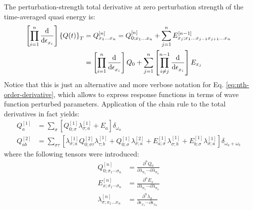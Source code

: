 The perturbation-strength total derivative at zero perturbation strength
of the time-averaged quasi energy is:
\begin{equation}
\begin{aligned}
 \left[\prod_{i=1}^n \frac{\mathop{}\!\mathrm{d}^{}}{\mathop{}\!\mathrm{d} \epsilon_{x_i}^{}}\right]\left\lbrace Q(t)\right\rbrace_T
 &= Q^{[n]}_{x_1 \ldots x_n}
 =
 Q^{[n]}_{0; x_1 \ldots x_n}
 + \sum_{j=1}^{n}E^{[n-1]}_{x_j;x_1\ldots x_{j-1}x_{j+1}\ldots x_n} \\
 &=
 \left[\prod_{i=1}^n \frac{\mathop{}\!\mathrm{d}^{}}{\mathop{}\!\mathrm{d} \epsilon_{x_i}^{}}\right]Q_0
 + \sum_{j=1}^n
 \left[\prod_{i\neq j}^{n-1} \frac{\mathop{}\!\mathrm{d}^{}}{\mathop{}\!\mathrm{d} \epsilon_{x_i}^{}}\right]E_{x_j}
\end{aligned}
\end{equation}
Notice that this is just an alternative and more verbose notation for
Eq. \eqref{eq:nth-order-derivative}, which allows to express response
functions in terms of wave function perturbed parameters.
Application of the chain rule to the total derivatives in fact yields:
\begin{subequations}
 \begin{align}
   Q^{[1]}_{a} &=
   \sum_{\sigma}\left[
   Q^{[1]}_{0; \sigma}\lambda^{[1]}_{\sigma;a} + E_{a}
   \right]\delta_{\omega_a} \\
   Q^{[2]}_{ab} &=
   \sum_{\sigma\tau}\left[
   \lambda^{[1]}_{\sigma;a}Q^{[2]}_{0;\sigma\tau}\lambda^{[1]}_{\tau;b}
   + Q^{[1]}_{0; \sigma}\lambda^{[2]}_{\sigma;a}
   + E^{[1]}_{a;\sigma}\lambda^{[1]}_{\sigma;b}
   + E^{[1]}_{b;\sigma}\lambda^{[1]}_{\sigma;a}
   \right]\delta_{\omega_a+\omega_b} \label{eq:linres}
 \end{align}
\end{subequations}
where the following tensors were introduced:
\begin{subequations}
 \begin{align}
 Q^{[n]}_{0; \sigma_1\cdots \sigma_n} &=
 \frac{\partial^n Q_0}{\partial\lambda_{\sigma_1}\cdots\partial\lambda_{\sigma_n}} \\
 E^{[n]}_{x;\sigma_1\cdots \sigma_n} &=
 \frac{\partial^n E_x}{\partial\lambda_{\sigma_1}\cdots\partial\lambda_{\sigma_n}} \\
\lambda^{[n]}_{\sigma;x_1\dots x_n} &=
\frac{\partial^n \lambda_\sigma}{\partial \epsilon_{x_1}\cdots\partial \epsilon_{x_n}}
 \end{align}
\end{subequations}

